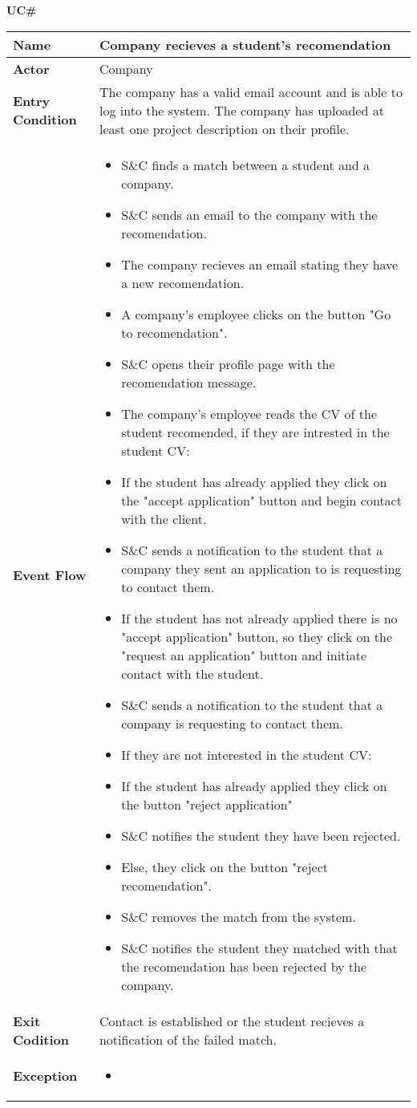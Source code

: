 \textbf{UC\#}

\begin{longtable}{|p{}|p{}|}
\hline
\textbf{Name} &  Company recieves a student's recomendation\\
\hline
\textbf{Actor} &  Company\\
\hline
\textbf{Entry Condition} &  The company has a valid email account and is able to log into the system. The company has uploaded at least one project description on their profile.\\
\hline
\textbf{Event Flow} &  
\begin{itemize}
\item S\&C finds a match between a student and a company.
\item S\&C sends an email to the company with the recomendation.
\item The company recieves an email stating they have a new recomendation.
\item A company's employee clicks on the button "Go to recomendation".
\item S\&C opens their profile page with the recomendation message.
\item The company's employee reads the CV of the student recomended, if they are intrested in the student CV:
\item If the student has already applied they click on the "accept application" button and begin contact with the client.
\item S\&C sends a notification to the student that a company they sent an application to is requesting to contact them.
\item If the student has not already applied there is no "accept application" button, so they click on the "request an application" button and initiate contact with the student.
\item S\&C sends a notification to the student that a company is requesting to contact them.
\item If they are not interested in the student CV:
\item If the student has already applied they click on the button "reject application"
\item S\&C notifies the student they have been rejected.
\item Else, they click on the button "reject recomendation".
\item S\&C removes the match from the system.
\item S\&C notifies the student they matched with that the recomendation has been rejected by the company. 
\end{itemize}\\
\hline
\textbf{Exit Codition} &  Contact is established or the student recieves a notification of the failed match.\\
\hline
\textbf{Exception} &  
\begin{itemize}
    \item 
\end{itemize}
\\
\hline
\end{longtable}



